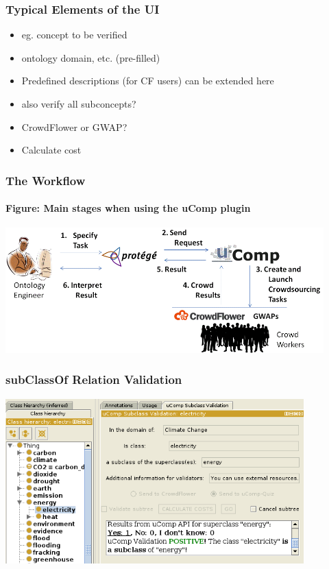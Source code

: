 \documentclass{beamer}
\begin{document}
\begin{frame}
  \frametitle{Typical Elements of the UI}
  \begin{itemize}
        \item {} eg. concept to be verified 
        \item {} ontology domain, etc. (pre-filled)
        \item {} Predefined descriptions (for CF users) can be extended here
        \item {} also verify all subconcepts?
        \item CrowdFlower or GWAP? 
        \item Calculate cost 
  \end{itemize}
\end{frame}

\begin{frame}
  \frametitle{The Workflow}
  \framesubtitle{Figure: Main stages when using the uComp plugin}
   \center
  \includegraphics[height=1.9in]{images/process}
\end{frame}


\begin{frame}
  \frametitle{subClassOf Relation Validation}
   \center
  \includegraphics[height=2.5in]{images/subclass_val_new}
\end{frame}
\end{document}
